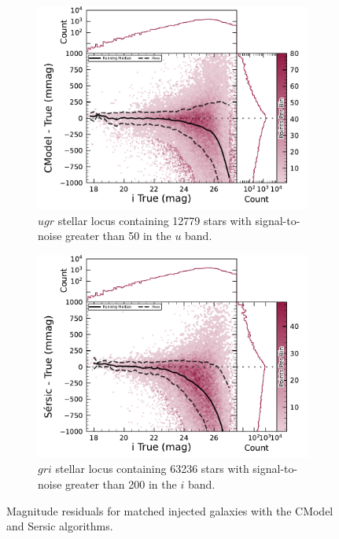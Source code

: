 \begin{figure}[hbt!]
  \centering
  \begin{subfigure}[t]{0.40\textwidth}
  \includegraphics[width=\linewidth]{injected_lsst_cells_v1_5063_i_mag_cmodel.pdf}
  \caption{$ugr$ stellar locus containing 12779 stars with signal-to-noise greater than 50 in the $u$ band.}
  \end{subfigure}\hfill
  \begin{subfigure}[t]{0.4\textwidth}
  \includegraphics[width=\linewidth]{injected_lsst_cells_v1_5063_i_mag_sersic.pdf}
  \caption{$gri$ stellar locus containing 63236 stars with signal-to-noise greater than 200 in the $i$ band.}
  \end{subfigure}\hfill
\caption{Magnitude residuals for matched injected galaxies with the CModel and Sersic algorithms.}
\label{fig:injected_lsst_cells_v1_5063_i_mag}
\vspace{0.1cm}
\end{figure}
